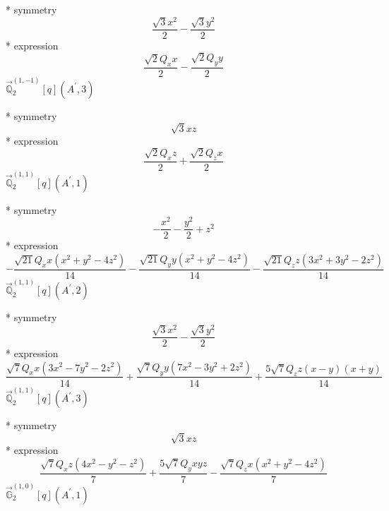 \documentclass[fleqn,8pt]{jsarticle}
\begin{document}
\noindent\quad ** symmetry
\begin{dmath*}
\frac{\sqrt{3} x^{2}}{2} - \frac{\sqrt{3} y^{2}}{2}
\end{dmath*}
\noindent\quad ** expression
\begin{dmath*}
\frac{\sqrt{2} Q_{x} x}{2} - \frac{\sqrt{2} Q_{y} y}{2}
\end{dmath*}
\noindent\quad $\vec{\mathbb{Q}}_{2}^{(1,-1)}[q](A^{\prime},3)$

\noindent\quad ** symmetry
\begin{dmath*}
\sqrt{3} x z
\end{dmath*}
\noindent\quad ** expression
\begin{dmath*}
\frac{\sqrt{2} Q_{x} z}{2} + \frac{\sqrt{2} Q_{z} x}{2}
\end{dmath*}
\noindent\quad $\vec{\mathbb{Q}}_{2}^{(1,1)}[q](A^{\prime},1)$

\noindent\quad ** symmetry
\begin{dmath*}
- \frac{x^{2}}{2} - \frac{y^{2}}{2} + z^{2}
\end{dmath*}
\noindent\quad ** expression
\begin{dmath*}
- \frac{\sqrt{21} Q_{x} x \left(x^{2} + y^{2} - 4 z^{2}\right)}{14} - \frac{\sqrt{21} Q_{y} y \left(x^{2} + y^{2} - 4 z^{2}\right)}{14} - \frac{\sqrt{21} Q_{z} z \left(3 x^{2} + 3 y^{2} - 2 z^{2}\right)}{14}
\end{dmath*}
\noindent\quad $\vec{\mathbb{Q}}_{2}^{(1,1)}[q](A^{\prime},2)$

\noindent\quad ** symmetry
\begin{dmath*}
\frac{\sqrt{3} x^{2}}{2} - \frac{\sqrt{3} y^{2}}{2}
\end{dmath*}
\noindent\quad ** expression
\begin{dmath*}
\frac{\sqrt{7} Q_{x} x \left(3 x^{2} - 7 y^{2} - 2 z^{2}\right)}{14} + \frac{\sqrt{7} Q_{y} y \left(7 x^{2} - 3 y^{2} + 2 z^{2}\right)}{14} + \frac{5 \sqrt{7} Q_{z} z \left(x - y\right) \left(x + y\right)}{14}
\end{dmath*}
\noindent\quad $\vec{\mathbb{Q}}_{2}^{(1,1)}[q](A^{\prime},3)$

\noindent\quad ** symmetry
\begin{dmath*}
\sqrt{3} x z
\end{dmath*}
\noindent\quad ** expression
\begin{dmath*}
\frac{\sqrt{7} Q_{x} z \left(4 x^{2} - y^{2} - z^{2}\right)}{7} + \frac{5 \sqrt{7} Q_{y} x y z}{7} - \frac{\sqrt{7} Q_{z} x \left(x^{2} + y^{2} - 4 z^{2}\right)}{7}
\end{dmath*}
\noindent\quad $\vec{\mathbb{G}}_{2}^{(1,0)}[q](A^{\prime},1)$
\end{document}
